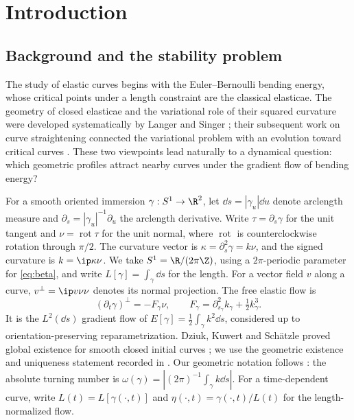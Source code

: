 \section{Introduction}\label{sec:intro}
\subsection{Background and the stability problem}
The study of elastic curves begins with the Euler--Bernoulli bending energy, whose critical points under a length constraint are the classical elasticae. The geometry of closed elasticae and the variational role of their squared curvature were developed systematically by Langer and Singer \cite{LS84}; their subsequent work on curve straightening connected the variational problem with an evolution toward critical curves \cite{LS85}. These two viewpoints lead naturally to a dynamical question: which geometric profiles attract nearby curves under the gradient flow of bending energy?

For a smooth oriented immersion $\gamma:S^1\to\R^2$, let $\dd s=|\gamma_u|\dd u$ denote arclength measure and $\partial_s=|\gamma_u|^{-1}\partial_u$ the arclength derivative. Write $\tau=\partial_s\gamma$ for the unit tangent and $\nu=\operatorname{rot}\tau$ for the unit normal, where $\operatorname{rot}$ is counterclockwise rotation through $\pi/2$. The curvature vector is $\kappa=\partial_s^2\gamma=k\nu$, and the signed curvature is $k=\ip\kappa\nu$. We take $S^1=\R/(2\pi\Z)$, using a $2\pi$-periodic parameter for \eqref{eq:beta}, and write $L[\gamma]=\int_\gamma\dd s$ for the length. For a vector field $v$ along a curve, $v^\perp=\ip v\nu\nu$ denotes its normal projection. The free elastic flow is
\begin{equation}\label{eq:flow}
 (\partial_t\gamma)^\perp=-F_\gamma\nu,
 \qquad F_\gamma=\partial_{s_\gamma}^2k_\gamma+\tfrac12k_\gamma^3.
\end{equation}
It is the $L^2(\dd s)$ gradient flow of $E[\gamma]=\frac12\int_\gamma k^2\dd s$, considered up to orientation-preserving reparametrization. Dziuk, Kuwert and Sch\"atzle proved global existence for smooth closed initial curves \cite[Theorem~3.2]{DKS}; we use the geometric existence and uniqueness statement recorded in \cite[Theorem~1.1]{MW}. Our geometric notation follows \cite[Section~2.1 and Theorem~1.2]{MW}: the absolute turning number is $\omega(\gamma)=\left|(2\pi)^{-1}\int_\gamma k\dd s\right|$. For a time-dependent curve, write $L(t)=L[\gamma(\cdot,t)]$ and $\eta(\cdot,t)=\gamma(\cdot,t)/L(t)$ for the length-normalized flow.

